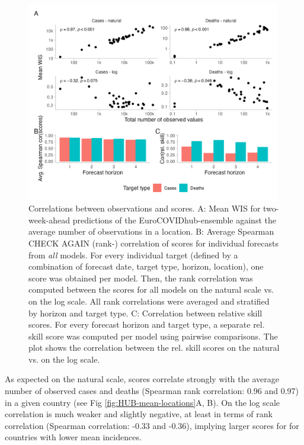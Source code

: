 \documentclass{article}
\begin{document}
\begin{figure}[h!]
    \centering
    \includegraphics[width=0.99\textwidth]{output/figures/HUB-correlations.png}
    \caption{Correlations between observations and scores. A: Mean WIS for two-week-ahead predictions of the EuroCOVIDhub-ensemble against the average number of observations in a location. B: Average Spearman CHECK AGAIN (rank-) correlation of scores for individual forecasts from \textit{all} models. For every individual target (defined by a combination of forecast date, target type, horizon, location), one score was obtained per model. Then, the rank correlation was computed between the scores for all models on the natural scale vs. on the log scale. All rank correlations were averaged and stratified by horizon and target type. C: Correlation between relative skill scores. For every forecast horizon and target type, a separate rel. skill score was computed per model using pairwise comparisons. The plot shows the correlation between the rel. skill scores on the natural vs. on the log scale.}
    \label{fig:HUB-cors}
\end{figure}

As expected on the natural scale, scores correlate strongly with the average number of observed cases and deaths (Spearman rank correlation: 0.96 and 0.97) in a given country (see Fig \ref{fig:HUB-mean-locations}A, B).
On the log scale correlation is much weaker and slightly negative, at least in terms of rank correlation (Spearman correlation: -0.33 and -0.36), implying larger scores for for countries with lower mean incidences. 
\end{document}
